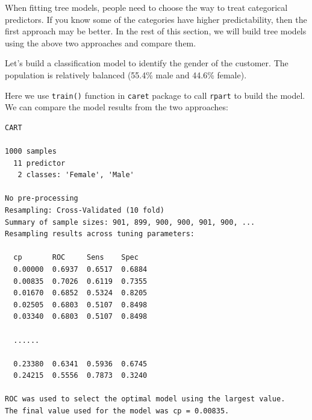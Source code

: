 \documentclass[12pt,]{krantz}
\makeatletter
\newenvironment{Shaded}{\begin{snugshade}}{\end{snugshade}}
\newcommand{\CommentTok}[1]{\textcolor[rgb]{0.37,0.37,0.37}{\textit{#1}}}
\newcommand{\DataTypeTok}[1]{\textcolor[rgb]{0.27,0.27,0.27}{#1}}
\newcommand{\KeywordTok}[1]{\textcolor[rgb]{0.27,0.27,0.27}{\textbf{#1}}}
\newcommand{\NormalTok}[1]{#1}
\newcommand{\OperatorTok}[1]{\textcolor[rgb]{0.43,0.43,0.43}{\textbf{#1}}}
\newcommand{\StringTok}[1]{\textcolor[rgb]{0.5,0.5,0.5}{#1}}
\newenvironment{kframe}{%
\medskip{}
\setlength{\fboxsep}{.8em}
 \def\at@end@of@kframe{}%
 \ifinner\ifhmode%
  \def\at@end@of@kframe{\end{minipage}}%
  \begin{minipage}{\columnwidth}%
 \fi\fi%
 \def\FrameCommand##1{\hskip\@totalleftmargin \hskip-\fboxsep
 \colorbox{shadecolor}{##1}\hskip-\fboxsep
     \hskip-\linewidth \hskip-\@totalleftmargin \hskip\columnwidth}%
 \MakeFramed {\advance\hsize-\width
   \@totalleftmargin\z@ \linewidth\hsize
   \@setminipage}}%
 {\par\unskip\endMakeFramed%
 \at@end@of@kframe}
\renewenvironment{Shaded}{\begin{kframe}}{\end{kframe}}
\makeatother
\begin{document}
When fitting tree models, people need to choose the way to treat categorical predictors. If you know some of the categories have higher predictability, then the first approach may be better. In the rest of this section, we will build tree models using the above two approaches and compare them.

Let's build a classification model to identify the gender of the customer. The population is relatively balanced (55.4\% male and 44.6\% female).

\begin{Shaded}
\end{Shaded}

Here we use \texttt{train()} function in \texttt{caret} package to call \texttt{rpart} to build the model. We can compare the model results from the two approaches:

\begin{verbatim}
CART 

1000 samples
  11 predictor
   2 classes: 'Female', 'Male' 

No pre-processing
Resampling: Cross-Validated (10 fold) 
Summary of sample sizes: 901, 899, 900, 900, 901, 900, ... 
Resampling results across tuning parameters:

  cp       ROC     Sens    Spec  
  0.00000  0.6937  0.6517  0.6884
  0.00835  0.7026  0.6119  0.7355
  0.01670  0.6852  0.5324  0.8205
  0.02505  0.6803  0.5107  0.8498
  0.03340  0.6803  0.5107  0.8498
  
  ......

  0.23380  0.6341  0.5936  0.6745
  0.24215  0.5556  0.7873  0.3240

ROC was used to select the optimal model using the largest value.
The final value used for the model was cp = 0.00835.
\end{verbatim}
\end{document}
